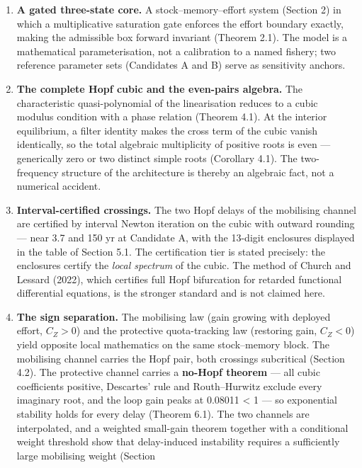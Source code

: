\documentclass[11pt]{article}
\begin{document}
\begin{enumerate}
\def\labelenumi{\arabic{enumi}.}
\item
  \textbf{A gated three-state core.} A stock--memory--effort system
  (Section 2) in which a multiplicative saturation gate enforces the
  effort boundary exactly, making the admissible box forward invariant
  (Theorem 2.1). The model is a mathematical parameterisation, not a
  calibration to a named fishery; two reference parameter sets
  (Candidates A and B) serve as sensitivity anchors.
\item
  \textbf{The complete Hopf cubic and the even-pairs algebra.} The
  characteristic quasi-polynomial of the linearisation reduces to a
  cubic modulus condition with a phase relation (Theorem 4.1). At the
  interior equilibrium, a filter identity makes the cross term of the
  cubic vanish identically, so the total algebraic multiplicity of
  positive roots is even --- generically zero or two distinct simple
  roots (Corollary 4.1). The two-frequency structure of the architecture
  is thereby an algebraic fact, not a numerical accident.
\item
  \textbf{Interval-certified crossings.} The two Hopf delays of the
  mobilising channel are certified by interval Newton iteration on the
  cubic with outward rounding --- near 3.7 and 150 yr at Candidate A,
  with the 13-digit enclosures displayed in the table of Section 5.1.
  The certification tier is stated precisely: the enclosures certify the
  \emph{local spectrum} of the cubic. The method of Church and Lessard
  (2022), which certifies full Hopf bifurcation for retarded functional
  differential equations, is the stronger standard and is not claimed
  here.
\item
  \textbf{The sign separation.} The mobilising law (gain growing with
  deployed effort, \(C_Z > 0\)) and the protective quota-tracking law
  (restoring gain, \(C_Z < 0\)) yield opposite local mathematics on the
  same stock--memory block. The mobilising channel carries the Hopf
  pair, both crossings subcritical (Section 4.2). The protective channel
  carries a \textbf{no-Hopf theorem} --- all cubic coefficients
  positive, Descartes' rule and Routh--Hurwitz exclude every imaginary
  root, and the loop gain peaks at 0.08011 \textless{} 1 --- so
  exponential stability holds for every delay (Theorem 6.1). The two
  channels are interpolated, and a weighted small-gain theorem together
  with a conditional weight threshold show that delay-induced
  instability requires a sufficiently large mobilising weight (Section

\end{enumerate}
\end{document}
